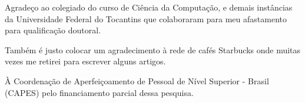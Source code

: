 Agradeço ao colegiado do curso de Ciência da Computação, e demais instâncias da Universidade Federal do Tocantins que colaboraram para meu afastamento para qualificação doutoral.



Também é justo colocar um agradecimento  à rede de cafés Starbucks onde muitas vezes me retirei para escrever alguns artigos. 


À Coordenação de Aperfeiçoamento 
de Pessoal de Nível Superior - Brasil (CAPES) pelo financiamento parcial dessa pesquisa.